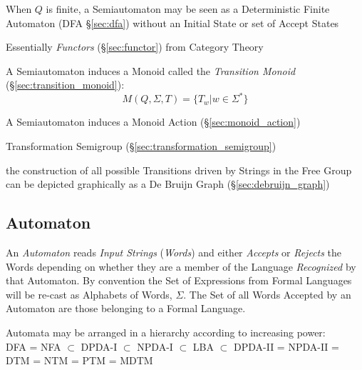 When $Q$ is finite, a Semiautomaton may be seen as a Deterministic
Finite Automaton (DFA \S\ref{sec:dfa}) without an Initial State or set
of Accept States

\fist Essentially \emph{Functors} (\S\ref{sec:functor}) from Category
Theory

A Semiautomaton induces a Monoid called the \emph{Transition Monoid}
(\S\ref{sec:transition_monoid}):
\[
  M(Q,\Sigma,T) = \{T_w | w \in \Sigma^*\}
\]

A Semiautomaton induces a Monoid Action (\S\ref{sec:monoid_action})

Transformation Semigroup (\S\ref{sec:transformation_semigroup})

the construction of all possible Transitions driven by Strings in the
Free Group can be depicted graphically as a De Bruijn Graph
(\S\ref{sec:debruijn_graph})




\subsection{Automaton} \label{sec:automaton}

An \emph{Automaton} reads \emph{Input Strings} (\emph{Words}) and
either \emph{Accepts} or \emph{Rejects} the Words depending on whether
they are a member of the Language \emph{Recognized} by that Automaton.
By convention the Set of Expressions from Formal Languages will be
re-cast as Alphabets of Words, $\Sigma$. The Set of all Words Accepted
by an Automaton are those belonging to a Formal Language.

Automata may be arranged in a hierarchy according to increasing
power:\\
DFA = NFA $\subset$ DPDA-I $\subset$ NPDA-I $\subset$ LBA
$\subset$ DPDA-II = NPDA-II = DTM = NTM = PTM = MDTM

